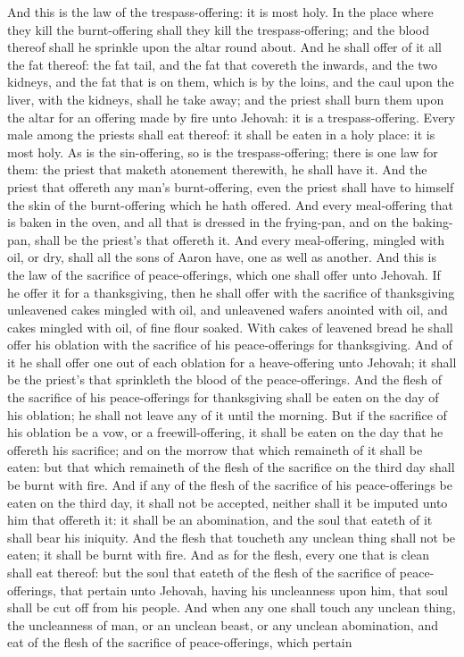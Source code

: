 And this is the law of the trespass-offering: it is most holy. In the place where they kill the burnt-offering shall they kill the trespass-offering; and the blood thereof shall he sprinkle upon the altar round about. And he shall offer of it all the fat thereof: the fat tail, and the fat that covereth the inwards, and the two kidneys, and the fat that is on them, which is by the loins, and the caul upon the liver, with the kidneys, shall he take away; and the priest shall burn them upon the altar for an offering made by fire unto Jehovah: it is a trespass-offering. Every male among the priests shall eat thereof: it shall be eaten in a holy place: it is most holy. As is the sin-offering, so is the trespass-offering; there is one law for them: the priest that maketh atonement therewith, he shall have it. And the priest that offereth any man’s burnt-offering, even the priest shall have to himself the skin of the burnt-offering which he hath offered. And every meal-offering that is baken in the oven, and all that is dressed in the frying-pan, and on the baking-pan, shall be the priest’s that offereth it. And every meal-offering, mingled with oil, or dry, shall all the sons of Aaron have, one as well as another.  And this is the law of the sacrifice of peace-offerings, which one shall offer unto Jehovah. If he offer it for a thanksgiving, then he shall offer with the sacrifice of thanksgiving unleavened cakes mingled with oil, and unleavened wafers anointed with oil, and cakes mingled with oil, of fine flour soaked. With cakes of leavened bread he shall offer his oblation with the sacrifice of his peace-offerings for thanksgiving. And of it he shall offer one out of each oblation for a heave-offering unto Jehovah; it shall be the priest’s that sprinkleth the blood of the peace-offerings.  And the flesh of the sacrifice of his peace-offerings for thanksgiving shall be eaten on the day of his oblation; he shall not leave any of it until the morning. But if the sacrifice of his oblation be a vow, or a freewill-offering, it shall be eaten on the day that he offereth his sacrifice; and on the morrow that which remaineth of it shall be eaten: but that which remaineth of the flesh of the sacrifice on the third day shall be burnt with fire. And if any of the flesh of the sacrifice of his peace-offerings be eaten on the third day, it shall not be accepted, neither shall it be imputed unto him that offereth it: it shall be an abomination, and the soul that eateth of it shall bear his iniquity.  And the flesh that toucheth any unclean thing shall not be eaten; it shall be burnt with fire. And as for the flesh, every one that is clean shall eat thereof: but the soul that eateth of the flesh of the sacrifice of peace-offerings, that pertain unto Jehovah, having his uncleanness upon him, that soul shall be cut off from his people. And when any one shall touch any unclean thing, the uncleanness of man, or an unclean beast, or any unclean abomination, and eat of the flesh of the sacrifice of peace-offerings, which pertain 